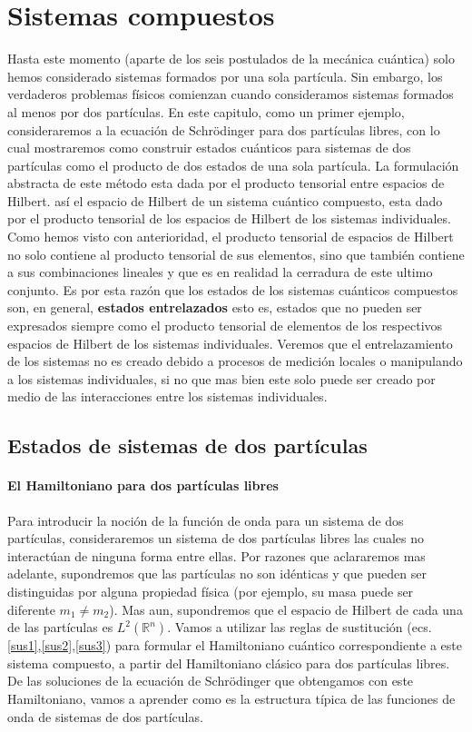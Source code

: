 \documentclass[12pt]{book}
\numberwithin{equation}{chapter}
\def\R{\mathbb{R}}
\begin{document}
\newpage

\chapter{Sistemas compuestos}
Hasta este momento (aparte de los seis postulados de la mec\'anica cu\'antica) solo hemos considerado sistemas formados por una sola part\'icula. Sin embargo, los verdaderos problemas f\'isicos comienzan cuando consideramos sistemas formados al menos por dos part\'iculas. En este capitulo, como un primer ejemplo, consideraremos a la ecuaci\'on de Schr\"odinger para dos part\'iculas libres, con lo cual mostraremos como construir estados cu\'anticos para sistemas de dos part\'iculas como el producto de dos estados de una sola part\'icula. La formulaci\'on abstracta de este m\'etodo esta dada por el producto tensorial entre espacios de Hilbert. as\'i el espacio de Hilbert de un sistema cu\'antico compuesto, esta dado por el producto tensorial de los espacios de Hilbert de los sistemas individuales. Como hemos visto con anterioridad, el producto tensorial de espacios de Hilbert no solo contiene al producto tensorial de sus elementos, sino que tambi\'en contiene a sus combinaciones lineales y que es en realidad la cerradura de este ultimo conjunto. Es por esta raz\'on que los estados de los sistemas cu\'anticos compuestos son, en general, {\bf estados entrelazados} esto es, estados que no pueden ser expresados siempre como el producto tensorial de elementos de los respectivos espacios de Hilbert de los sistemas individuales. Veremos que el entrelazamiento de los sistemas no es creado debido a procesos de medici\'on locales o manipulando a los sistemas individuales, si no que mas bien este solo puede ser creado por medio de las interacciones entre los sistemas individuales.  

\section{Estados de sistemas de dos part\'iculas}

\subsubsection{El Hamiltoniano para dos part\'iculas libres}
Para introducir la noci\'on de la funci\'on de onda para un sistema de dos part\'iculas, consideraremos un sistema de dos part\'iculas libres las cuales no interact\'uan de ninguna forma entre ellas. Por razones que aclararemos mas adelante, supondremos que las part\'iculas no son id\'enticas y que pueden ser distinguidas por alguna propiedad f\'isica (por ejemplo, su masa puede ser diferente $m_{1} \neq m_{2}$). Mas aun, supondremos que el espacio de Hilbert de cada una de las part\'iculas es $L^{2}(\R^{n})$. Vamos a utilizar las reglas de sustituci\'on (ecs. \eqref{sus1},\eqref{sus2},\eqref{sus3}) para formular el Hamiltoniano cu\'antico correspondiente a este sistema compuesto, a partir del Hamiltoniano cl\'asico para dos part\'iculas libres. De las soluciones de la ecuaci\'on de Schr\"odinger que obtengamos con este Hamiltoniano, vamos a aprender como es la estructura t\'ipica de las funciones de onda de sistemas de dos part\'iculas.
\end{document}
